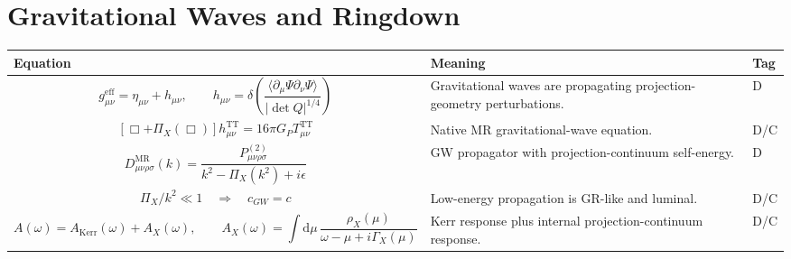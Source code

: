 \documentclass[11pt]{article}
\newcommand{\MR}{\mathrm{MR}}
\newcommand{\eff}{\mathrm{eff}}
\newcommand{\dd}{\mathrm{d}}
\newcommand{\TT}{\mathrm{TT}}
\newcommand{\Kerr}{\mathrm{Kerr}}
\begin{document}
\section{Gravitational Waves and Ringdown}
\begin{longtable}{>{\raggedright\arraybackslash}p{} >{\raggedright\arraybackslash}p{} >{\centering\arraybackslash}p{}}
\toprule
\textbf{Equation} & \textbf{Meaning} & \textbf{Tag} \\
\midrule
\endhead

\begin{equation}
g_{\mu\nu}^{\eff}=\eta_{\mu\nu}+h_{\mu\nu},
\qquad h_{\mu\nu}=\delta\left(\frac{\langle\partial_\mu\Psi\partial_\nu\Psi\rangle}{|\det Q|^{1/4}}\right)
\end{equation}
& Gravitational waves are propagating projection-geometry perturbations. & D \\

\begin{equation}
\left[\Box+\Pi_X(\Box)\right]h_{\mu\nu}^{\TT}=16\pi G_PT_{\mu\nu}^{\TT}
\end{equation}
& Native MR gravitational-wave equation. & D/C \\

\begin{equation}
D_{\mu\nu\rho\sigma}^{\MR}(k)=\frac{P^{(2)}_{\mu\nu\rho\sigma}}{k^2-\Pi_X(k^2)+i\epsilon}
\end{equation}
& GW propagator with projection-continuum self-energy. & D \\

\begin{equation}
\Pi_X/k^2\ll1\quad\Rightarrow\quad c_{GW}=c
\end{equation}
& Low-energy propagation is GR-like and luminal. & D/C \\

\begin{equation}
A(\omega)=A_{\Kerr}(\omega)+A_X(\omega),
\qquad
A_X(\omega)=\int\dd\mu\,\frac{\rho_X(\mu)}{\omega-\mu+i\Gamma_X(\mu)}
\end{equation}
& Kerr response plus internal projection-continuum response. & D/C \\

\bottomrule
\end{longtable}
\end{document}
